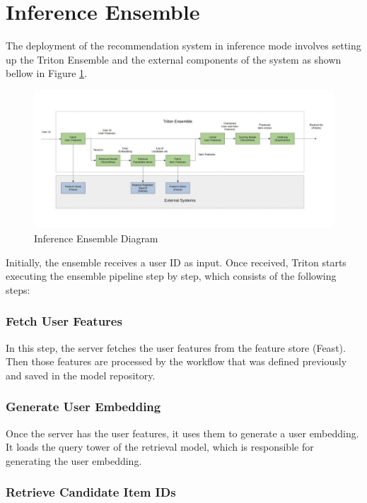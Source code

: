 \section{Inference Ensemble}

The deployment of the recommendation system in inference mode involves setting up the Triton Ensemble and the external components of the system as shown bellow in Figure \ref{fig:DeploymentDiagram}.

\begin{figure}[H]
    \centering
    \includegraphics[width=\textwidth]{assets/deployment.jpg}
    \caption{Inference Ensemble Diagram}
    \label{fig:DeploymentDiagram}
\end{figure}

Initially, the ensemble receives a user ID as input. Once received, Triton starts executing the ensemble pipeline step by step, which consists of the following steps:

\subsubsection{Fetch User Features}

In this step, the server fetches the user features from the feature store (Feast). Then those features are processed by the workflow that was defined previously and saved in the model repository.

\subsubsection{Generate User Embedding}

Once the server has the user features, it uses them to generate a user embedding. 
It loads the query tower of the retrieval model, which is responsible for generating the user embedding. 

\subsubsection{Retrieve Candidate Item IDs}

